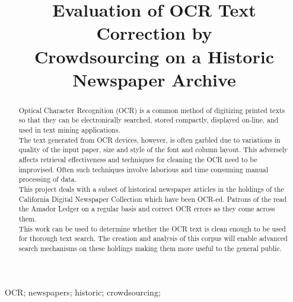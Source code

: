 \documentclass[10pt, conference, compsocconf]{IEEEtran}
\begin{document}
\title{Evaluation of OCR Text Correction by\\
	 Crowdsourcing on a Historic Newspaper Archive}

\author{
}

\maketitle

\begin{abstract}

Optical Character Recognition (OCR) is a common method of digitizing printed texts so that they can be electronically searched, stored compactly, displayed on-line, and used in text mining applications.\\
The text generated from OCR devices, however, is often garbled due to variations in quality of the input paper, size and style of the font and column layout. This adversely affects retrieval effectiveness and techniques for cleaning the OCR need to be improvised. Often such techniques involve laborious and time consuming manual processing of data.\\
This project deals with a subset of historical newspaper articles in the holdings of the California Digital Newspaper Collection \cite{cdnc} which have been OCR-ed. Patrons of the \cite{cdnc} read the Amador Ledger on a regular basis and correct OCR errors as they come across them.\\
This work can be used to determine whether the OCR text is clean enough to be used for thorough text search. The creation and analysis of this corpus will enable advanced search mechanisms on these holdings making them more
useful to the general public.\\

\end{abstract}

\begin{IEEEkeywords}
OCR; newspapers; historic; crowdsourcing;
\end{IEEEkeywords}
\end{document}
